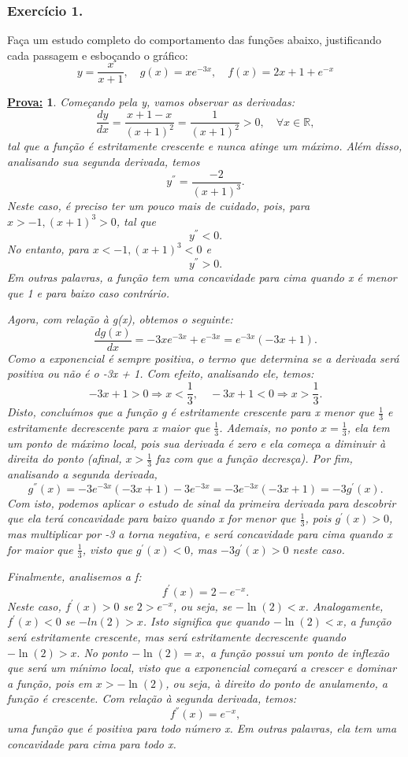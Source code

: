 \documentclass{article}
\newtheorem*{proof*}{\underline{Prova:}}
\begin{document}
\subsubsection{Exerc\'icio 1.}
Fa\c ca um estudo completo do comportamento das fun\c c\~oes abaixo, justificando
cada passagem e esbo\c cando o gr\'afico:
\begin{equation*}
	y = \frac{x}{x+1}, \quad g(x) = xe^{-3x}, \quad f(x) = 2x + 1 + e^{-x}
\end{equation*}
\begin{proof*}
	Come\c cando pela y, vamos observar as derivadas:
	\[
		\frac{dy}{dx}= \frac{x+1 - x}{(x+1)^{2}}= \frac{1}{(x+1)^{2}}> 0, \quad\forall x\in\mathbb{R},
	\]
	tal que a fun\c c\~ao \'e estritamente crescente e nunca atinge um m\'aximo. Al\'em
	disso, analisando sua segunda derivada, temos
	\[
		y^{''}= \frac{-2}{(x+1)^{3}}.
	\]
	Neste caso, \'e preciso ter um pouco mais de cuidado, pois, para $x > -1, (x+1)
		^{3} > 0$, tal que
	\[
		y^{''}< 0.
	\]
	No entanto, para $x < -1, (x + 1)^{3} < 0$ e
	\[
		y^{''}> 0.
	\]
	Em outras palavras, a fun\c c\~ao tem uma concavidade para cima quando x \'e
	menor que 1 e para baixo caso contr\'ario.

	Agora, com rela\c c\~ao \`a g(x), obtemos o seguinte:
	\[
		\frac{d g(x)}{dx}= -3xe^{-3x}+ e^{-3x}= e^{-3x}(-3x + 1).
	\]
	Como a exponencial \'e sempre positiva, o termo que determina se a derivada
	ser\'a positiva ou n\~ao \'e o -3x + 1. Com efeito, analisando ele, temos:
	\[
		-3x + 1 > 0 \Rightarrow x < \frac{1}{3}, \quad -3x + 1 < 0 \Rightarrow x > \frac{1}{3}.
	\]
	Disto, conclu\'imos que a fun\c c\~ao g \'e estritamente crescente para x
	menor que $\frac{1}{3}$ e estritamente decrescente para x maior que
	$\frac{1}{3}$. Ademais, no ponto $x = \frac{1}{3}$, ela tem um ponto de m\'aximo
	local, pois sua derivada \'e zero e ela come\c ca a diminuir \`a direita do ponto
	(afinal, $x > \frac{1}{3}$ faz com que a fun\c c\~ao decres\c ca).
	Por fim, analisando a segunda derivada,
	\[
		g^{''}(x) = -3e^{-3x}(-3x + 1) -3e^{-3x}= -3e^{-3x}(-3x + 1) = -3g^{'}(x).
	\]
	Com isto, podemos aplicar o estudo de sinal da primeira derivada para descobrir
	que ela ter\'a concavidade para baixo quando x for menor que $\frac{1}{3}$,
	pois $g^{'}(x) > 0$, mas multiplicar por -3 a torna negativa, e ser\'a concavidade
	para cima quando x for maior que $\frac{1}{3}$, visto que $g^{'}(x) < 0$, mas $-
		3g^{'}(x) > 0$ neste caso.

	Finalmente, analisemos a f:
	\[
		f^{'}(x) = 2 - e^{-x}.
	\]
	Neste caso, $f^{'}(x) > 0$ se $2 > e^{-x}$, ou seja, se $-\ln(2) < x$. Analogamente,
	$f^{'}(x) < 0$ se $-ln(2) > x$. Isto significa que quando $-\ln(2) < x$, a fun\c
	c\~ao ser\'a estritamente crescente, mas ser\'a estritamente decrescente
	quando $-\ln(2) > x.$ No ponto $-\ln(2) = x,$ a fun\c c\~ao possui um ponto de
	inflex\~ao que ser\'a um m\'inimo local, visto que a exponencial come\c car\'a
	a crescer e dominar a fun\c c\~ao, pois em $x > -\ln(2)$, ou seja, \`a direito do ponto de
	anulamento, a fun\c c\~ao \'e crescente. Com rela\c c\~ao \`a segunda derivada,
	temos:
	\[
		f^{''}(x) = e^{-x},
	\]
	uma fun\c c\~ao que \'e positiva para todo n\'umero x. Em outras palavras, ela
	tem uma concavidade para cima para todo x.


\end{proof*}
\end{document}
